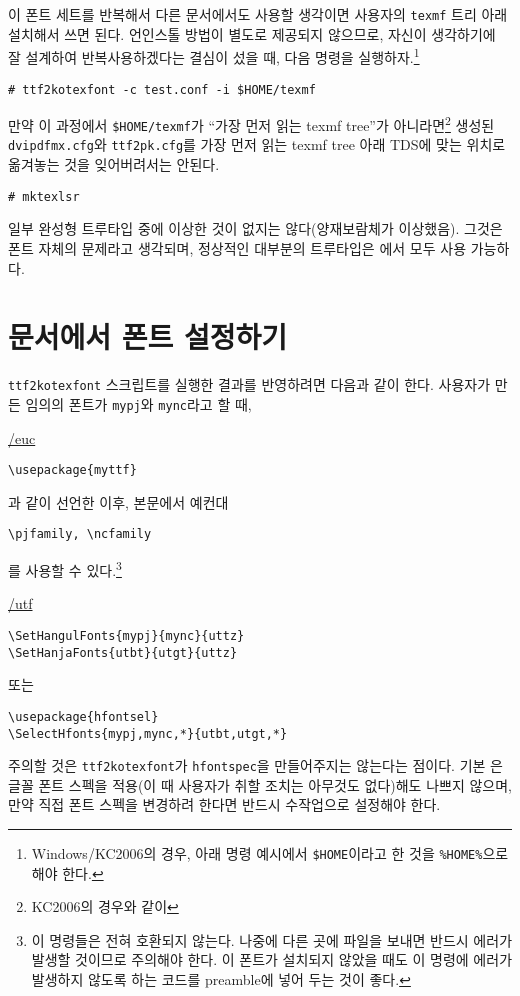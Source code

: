 이 폰트 세트를 반복해서 다른 문서에서도 사용할 생각이면 사용자의 \texttt{texmf} 트리 아래 설치해서 쓰면 된다.
언인스톨 방법이 별도로 제공되지 않으므로, 자신이 생각하기에 잘 설계하여 반복사용하겠다는 결심이 섰을 때, 다음 명령을 실행하자.\footnote{%
  Windows/KC2006의 경우, 아래 명령 예시에서 \texttt{\$HOME}이라고
  한 것을 \texttt{\%HOME\%}으로 해야 한다.}
\begin{verbatim}
# ttf2kotexfont -c test.conf -i $HOME/texmf
\end{verbatim}

만약 이 과정에서 \verb|$HOME/texmf|가 ``가장 먼저 읽는 texmf tree''가 아니라면\footnote{KC2006의 경우와 같이}
생성된 \texttt{dvipdfmx.cfg}와 \texttt{ttf2pk.cfg}를 가장 먼저 읽는
texmf tree 아래 TDS에 맞는 위치로 옮겨놓는 것을 잊어버려서는 안된다. 
\begin{verbatim}
# mktexlsr
\end{verbatim}

일부 완성형 트루타입 중에 이상한 것이 없지는 않다(양재보람체가 이상했음). 그것은 폰트 자체의 문제라고 생각되며, 정상적인 대부분의 트루타입은 \kotex 에서 모두 사용 가능하다.

\section{문서에서 폰트 설정하기}

\texttt{ttf2kotexfont} 스크립트를 실행한 결과를 반영하려면 다음과 같이
한다. 사용자가 만든 임의의 폰트가 \texttt{mypj}와 \texttt{mync}라고 할 때,

\bigskip
\noindent\underline{\kotex/euc}
\begin{verbatim}
\usepackage{myttf}
\end{verbatim}
과 같이 선언한 이후, 본문에서 예컨대
\begin{verbatim}
\pjfamily, \ncfamily
\end{verbatim}
를 사용할 수 있다.\footnote{%
  이 명령들은 전혀 호환되지 않는다. 나중에 다른 곳에 파일을 보내면
  반드시 에러가 발생할 것이므로 주의해야 한다. 이 폰트가 설치되지
  않았을 때도 이 명령에 에러가 발생하지 않도록 하는 코드를 preamble에
  넣어 두는 것이 좋다.
}

\medskip
\noindent\underline{\kotex/utf}
\begin{verbatim}
\SetHangulFonts{mypj}{mync}{uttz}
\SetHanjaFonts{utbt}{utgt}{uttz}
\end{verbatim}
또는
\begin{verbatim}
\usepackage{hfontsel}
\SelectHfonts{mypj,mync,*}{utbt,utgt,*}
\end{verbatim}
주의할 것은 \texttt{ttf2kotexfont}가 \texttt{hfontspec}을
만들어주지는 않는다는 점이다. 기본 은 글꼴 폰트 스펙을 적용(이 때 
사용자가 취할 조치는 아무것도 없다)해도 나쁘지 않으며, 만약 직접
폰트 스펙을 변경하려 한다면 반드시 수작업으로 설정해야 한다.


